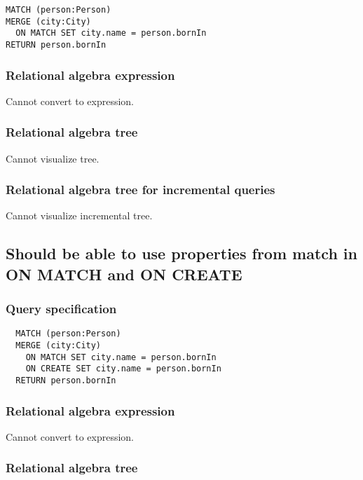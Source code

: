 \begin{lstlisting}
MATCH (person:Person)
MERGE (city:City)
  ON MATCH SET city.name = person.bornIn
RETURN person.bornIn
\end{lstlisting}

\subsubsection*{Relational algebra expression}

Cannot convert to expression.

\subsubsection*{Relational algebra tree}

Cannot visualize tree.

\subsubsection*{Relational algebra tree for incremental queries}

Cannot visualize incremental tree.

\subsection{Should be able to use properties from match in ON MATCH and ON CREATE}

\subsubsection*{Query specification}

\begin{lstlisting}
  MATCH (person:Person)
  MERGE (city:City)
    ON MATCH SET city.name = person.bornIn
    ON CREATE SET city.name = person.bornIn
  RETURN person.bornIn
\end{lstlisting}

\subsubsection*{Relational algebra expression}

Cannot convert to expression.

\subsubsection*{Relational algebra tree}

